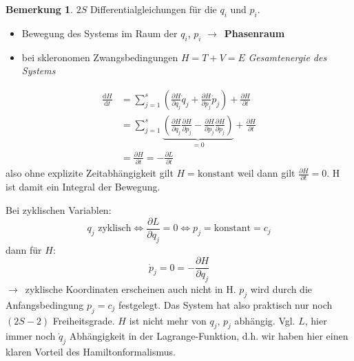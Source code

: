 \documentclass[oneside]{book}
\theoremstyle{definition}
\newtheorem*{bemerkung*}{Bemerkung}
\newcommand{\conseq}{$\rightarrow$~}
\renewcommand{\d}{\mathrm d}
\newcommand{\ddd}[2]{\frac{\d #1}{\d #2}}
\newcommand{\ffpartial}[2]{\frac{\partial #1}{\partial #2}}
\newcommand{\const}{\text{konstant}}
\begin{document}
\begin{bemerkung*}
	$2S$ Differentialgleichungen für die $q_i$ und $p_i$.
	\begin{itemize}
		\item Bewegung des Systems im Raum der $q_i$, $p_i$ \conseq \textbf{Phasenraum}
		\item bei skleronomen Zwangsbedingungen $H = T + V = E$ \textit{Gesamtenergie des Systems}
	\end{itemize}
\end{bemerkung*}
\begin{align*}
	\ddd{H}{t} &= \sum_{j=1}^{s} (\ffpartial{H}{q_j} \dot{q}_j + \ffpartial{H}{p_j} \dot{p}_j) + \ffpartial{H}{t}\\
	&= \sum_{j=1}^{s} \underbrace{(\ffpartial{H}{q_j} \ffpartial{H}{p_j} - \ffpartial{H}{p_j} \ffpartial{H}{p_j})}_{=0}+ \ffpartial{H}{t}\\
	&= \ffpartial{H}{t} = - \ffpartial{L}{t}
\end{align*} 
also ohne explizite Zeitabhängigkeit gilt $H = \const$ weil dann gilt $\ffpartial{H}{t} = 0$. H ist damit ein Integral der Bewegung.

Bei zyklischen Variablen:
$$q_j \text{~zyklisch} \Leftrightarrow \ffpartial{L}{q_j} = 0 \Leftrightarrow p_j = \const = c_j$$
dann für $H$:
$$\dot{p}_j = 0 = -\ffpartial{H}{q_j}$$
\conseq zyklische Koordinaten erscheinen auch nicht in H.
$p_j$ wird durch die Anfangsbedingung $p_j = c_j$ festgelegt. Das System hat also praktisch nur noch $(2S -2)$ Freiheitsgrade.
$H$ ist nicht mehr von $q_j$, $p_j$ abhängig. Vgl. $L$, hier immer noch $\dot{q}_j$ Abhängigkeit in der Lagrange-Funktion, d.h. wir haben hier einen klaren Vorteil des Hamiltonformalismus.
\end{document}
